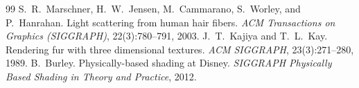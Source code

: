 \documentclass[11pt]{article}
\begin{document}

\begin{thebibliography}{99}
    S.~R.~Marschner, H.~W.~Jensen, M.~Cammarano, S.~Worley, and P.~Hanrahan.
    \newblock Light scattering from human hair fibers.
    \newblock \textit{ACM Transactions on Graphics (SIGGRAPH)}, 22(3):780--791, 2003.
    J.~T.~Kajiya and T.~L.~Kay.
    \newblock Rendering fur with three dimensional textures.
    \newblock \textit{ACM SIGGRAPH}, 23(3):271--280, 1989.
    B.~Burley.
    \newblock Physically-based shading at Disney.
    \newblock \textit{SIGGRAPH Physically Based Shading in Theory and Practice}, 2012.
\end{thebibliography}
\end{document}
